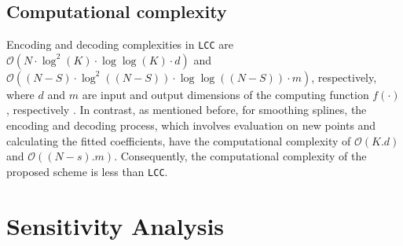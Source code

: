 \documentclass{article}
\begin{document}
\subsection{Computational complexity} Encoding and decoding complexities in \texttt{LCC} are $\mathcal{O}(N\cdot \log^2(K) \cdot \log\log (K)\cdot d)$ and $\mathcal{O}((N-S)\cdot \log^2((N-S)) \cdot \log\log ((N-S))\cdot m)$, respectively, where $d$ and $m$ are input and output dimensions of the computing function $f(\cdot)$, respectively \citep{yu2019lagrange}. In contrast, as mentioned before, for smoothing splines, the encoding and decoding process, which involves evaluation on new points and calculating the fitted coefficients, have the computational complexity of $\mathcal{O}(K.d)$ and $\mathcal{O}((N-s).m)$. Consequently, the computational complexity of the proposed scheme is less than \texttt{LCC}.
\section{Sensitivity Analysis}\label{app:sens_analysis}
\end{document}
